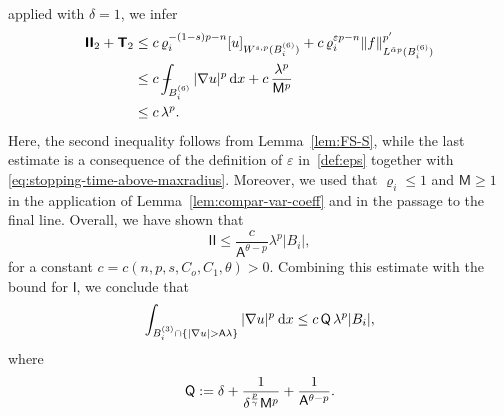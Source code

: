 \documentclass[10pt,letterpaper]{amsart}
\theoremstyle{definition}
\numberwithin{theorem}{section}
\numberwithin{equation}{section}
\newcommand{\mint}{- \mskip-19,5mu \int}
\newcommand{\1}{\ensuremath{\mathds{1}}}
\newcommand{\dx}{\mathrm{d}x}
\newcommand\sfI{{\boldsymbol{\mathsf I}}}
\newcommand\sfT{{\boldsymbol{\mathsf T}}}
\renewcommand{\epsilon}{\varepsilon}
\renewcommand{\rho}{\varrho}
\renewcommand{\epsilon}{\varepsilon}
\renewcommand{\rho}{\varrho}
\renewcommand{\d}{\:\! \mathrm{d}}
\numberwithin{equation}{section}
\begin{document}
applied with $\delta=1$, we infer
\begin{align*}
    \sfI\sfI_2 + \sfT_2
    &\le 
    c\,\rho_i^{-(1-s)p-n} [u]_{W^{s,p}(B_i^{(6)})} +
    c\,\rho_i^{\epsilon p-n} \|f\|_{L^{\tilde\alpha p}(B_i^{(6)})}^{p'} \\
    &\le 
    c \mint_{B_i^{(6)}} |\nabla u|^p\,\dx +
    c\,  \frac{\lambda^p}{\mathsf M^p}\\
    &\le 
    c\,\lambda^p .
\end{align*}
Here, the second inequality follows from Lemma~\ref{lem:FS-S},
while the last estimate is a consequence of the definition of
$\epsilon$ in~\eqref{def:eps} together with
\eqref{eq:stopping-time-above-maxradius}.
Moreover, we used that $\rho_i\le 1$ and $\mathsf M\ge 1$ in the application
of Lemma~\ref{lem:compar-var-coeff} and in the passage to the final line. 
Overall, we have shown that 
$$
    \sfI\sfI 
    \leq 
    \frac{c}{\mathsf A^{\theta-p}} \lambda^p |B_i|,
$$
for a constant $c = c(n,p,s,C_o,C_1,\theta)> 0$.
Combining this estimate with the bound for $\sfI$, we conclude that
\begin{align}\label{est:super-nabla-u}
    \int_{B_i^{(3)}\cap \left\{ |\nabla u| >\mathsf A \lambda \right\}} |\nabla u|^p \, \d x 
    \le 
    c\, {\sf Q} \, \lambda^p |B_i| ,
\end{align}
where 
\begin{equation}\label{def:M}
    {\sf Q}
    :=
    \delta + 
    \frac{1}{\delta^\frac{p}{\gamma} \mathsf M^p} +
    \frac{1}{\mathsf A^{\theta-p}}.
\end{equation}
\end{document}
